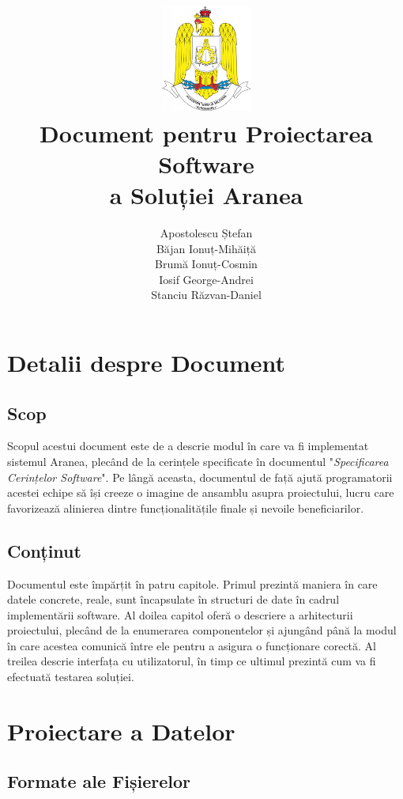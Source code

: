 \documentclass[12pt]{article}
\title{
    \includegraphics[width=3cm, height=3.5cm]{Academy Logo.png} \\
    \vspace{5mm}
    {Document pentru Proiectarea Software\\
    a Soluției \textbf{Aranea}}
    \vspace{10mm}
}
\author{
    Apostolescu Ștefan \\
    Băjan Ionuț-Mihăiță \\
    Brumă Ionuț-Cosmin \\
    Iosif George-Andrei \\
    Stanciu Răzvan-Daniel \\
    \vspace{10mm}
}
\begin{document}
\null
\nointerlineskip 
\vfill
\let\snewpage \newpage
\let\newpage \relax
\maketitle
\let \newpage \snewpage
\vfill 
\break

\newpage

\tableofcontents

\newpage

\listoffigures

\listoftables

\listoflistings

\newpage

\section{Detalii despre Document}

\subsection{Scop}
Scopul acestui document este de a descrie modul în care va fi implementat sistemul Aranea, plecând de la cerințele specificate în documentul "\textit{Specificarea Cerințelor Software}". Pe lângă aceasta, documentul de față ajută programatorii acestei echipe să își creeze o imagine de ansamblu asupra proiectului, lucru care favorizează alinierea dintre funcționalitățile finale și nevoile beneficiarilor.

\subsection{Conținut}
Documentul este împărțit în patru capitole. Primul prezintă maniera în care datele concrete, reale, sunt încapsulate în structuri de date în cadrul implementării software. Al doilea capitol oferă o descriere a arhitecturii proiectului, plecând de la enumerarea componentelor și ajungând până la modul în care acestea comunică între ele pentru a asigura o funcționare corectă. Al treilea descrie interfața cu utilizatorul, în timp ce ultimul prezintă cum va fi efectuată testarea soluției.

\newpage

\section{Proiectare a Datelor}

\subsection{Formate ale Fișierelor}
\end{document}
